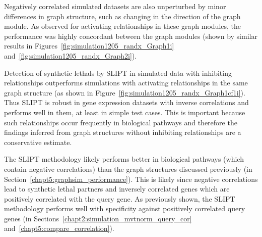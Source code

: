 Negatively correlated simulated datasets are also unperturbed by minor differences in \gls{graph} structure, such as changing in the direction of the graph module. As observed for activating relationships in these graph modules, the performance was highly concordant between the graph modules (shown by similar results in Figures~\ref{fig:simulation1205_randx_Graph1i} and~\ref{fig:simulation1205_randx_Graph2i}).

Detection of \glspl{synthetic lethal} by \gls{SLIPT} in simulated data with inhibiting relationships outperforms simulations with activating relationships in the same \gls{graph} structure (as shown in Figure~\ref{fig:simulation1205_randx_Graph1cf1i}). Thus \gls{SLIPT} is robust in \gls{gene expression} datasets with inverse correlations and performs well in them, at least in simple test cases. This is important because such relationships occur frequently in biological pathways and therefore the findings inferred from \gls{graph} structures without inhibiting relationships are a conservative estimate.

The \gls{SLIPT} methodology likely performs better in biological pathways (which contain negative correlations) than the \gls{graph} structures discussed previously (in Section~\ref{chapt5:graphsim_performance}). This is likely since negative correlations lead to \gls{synthetic lethal} partners and inversely correlated genes which are positively correlated with the query gene. As previously shown, the \gls{SLIPT} methodology performs well with specificity against positively correlated query genes (in Sections~\ref{chapt2:simulation_mvtnorm_query_cor} and~\ref{chapt5:compare_correlation}).%

